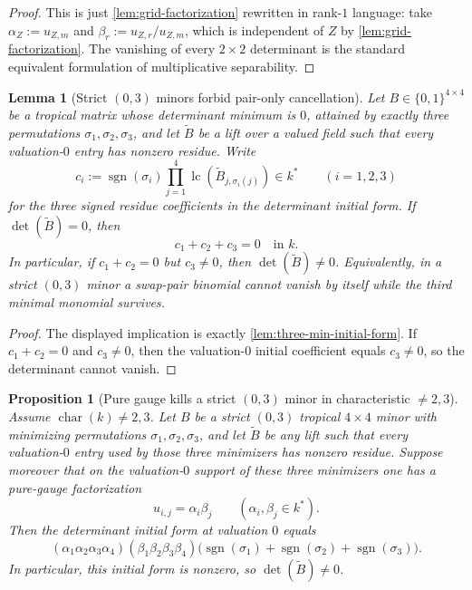 \documentclass[11pt]{amsart}
\numberwithin{equation}{section}
\theoremstyle{plain}
\newtheorem{lemma}[theorem]{Lemma}
\newtheorem{proposition}[theorem]{Proposition}
\theoremstyle{definition}
\theoremstyle{remark}
\begin{document}
\begin{proof}
This is just \cref{lem:grid-factorization} rewritten in rank-$1$ language: take $\alpha_Z:=u_{Z,m}$ and $\beta_r:=u_{Z,r}/u_{Z,m}$, which is independent of $Z$ by \cref{lem:grid-factorization}. The vanishing of every $2\times2$ determinant is the standard equivalent formulation of multiplicative separability.
\end{proof}

\begin{lemma}[Strict $(0,3)$ minors forbid pair-only cancellation]
\label{lem:strict03-no-pair-only-cancel}
Let $B\in\{0,1\}^{4\times4}$ be a tropical matrix whose determinant minimum is $0$, attained by exactly three permutations $\sigma_1,\sigma_2,\sigma_3$, and let $\widetilde B$ be a lift over a valued field such that every valuation-$0$ entry has nonzero residue. Write
\[
c_i:=\operatorname{sgn}(\sigma_i)\prod_{j=1}^4 \operatorname{lc}(\widetilde B_{j,\sigma_i(j)})\in k^*
\qquad (i=1,2,3)
\]
for the three signed residue coefficients in the determinant initial form. If $\det(\widetilde B)=0$, then
\[
c_1+c_2+c_3=0
\quad\text{in }k.
\tag{17.4}
\]
In particular, if $c_1+c_2=0$ but $c_3\neq 0$, then $\det(\widetilde B)\neq 0$. Equivalently, in a strict $(0,3)$ minor a swap-pair binomial cannot vanish by itself while the third minimal monomial survives.
\end{lemma}

\begin{proof}
The displayed implication is exactly \cref{lem:three-min-initial-form}. If $c_1+c_2=0$ and $c_3\neq 0$, then the valuation-$0$ initial coefficient equals $c_3\neq 0$, so the determinant cannot vanish.
\end{proof}

\begin{proposition}[Pure gauge kills a strict $(0,3)$ minor in characteristic $\neq 2,3$]
\label{prop:pure-gauge-kills-strict03}
Assume $\operatorname{char}(k)\neq 2,3$. Let $B$ be a strict $(0,3)$ tropical $4\times4$ minor with minimizing permutations
$\sigma_1,\sigma_2,\sigma_3$, and let $\widetilde B$ be any lift such that every valuation-$0$ entry used by those three minimizers has
nonzero residue. Suppose moreover that on the valuation-$0$ support of these three minimizers one has a pure-gauge factorization
\[
u_{i,j}=\alpha_i\beta_j
\qquad (\alpha_i,\beta_j\in k^*).
\tag{18.3}
\]
Then the determinant initial form at valuation $0$ equals
\[
(\alpha_1\alpha_2\alpha_3\alpha_4)(\beta_1\beta_2\beta_3\beta_4)
\bigl(\operatorname{sgn}(\sigma_1)+\operatorname{sgn}(\sigma_2)+\operatorname{sgn}(\sigma_3)\bigr).
\tag{18.4}
\]
In particular, this initial form is nonzero, so $\det(\widetilde B)\neq 0$.
\end{proposition}
\end{document}
